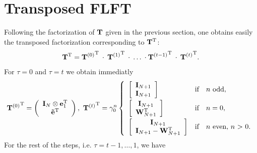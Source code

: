 \section{Transposed FLFT}
Following the factorization of $\mathbf{T}$ given in the previous section, one obtains easily the transposed factorization corresponding to $\mathbf{T^{\text{\rm{T}}}}$:
\[
  \mathbf{T}^{\text{\rm{T}}} = {\mathbf{T}^{(0)}}^{\text{\rm{T}}} \: \cdot \: {\mathbf{T}^{(1)}}^{\text{\rm{T}}} \: \cdot \: \ldots \: \cdot {\mathbf{T}^{(t-1)}}^{\text{\rm{T}}} \: \cdot \: {\mathbf{T}^{(t)}}^{\text{\rm{T}}}.
\] 
For $\tau = 0$ and $\tau = t$ we obtain immediatly
\[
  {\V{T}^{(0)}}^{\transp} = 
     \left(\begin{array}{c} 
       \V{I}_{N} \otimes \V{e}_{1}^{\transp}\\ 
       \V{\tilde{e}}^{\transp} 
     \end{array}\right),\  
   {\V{T}^{(t)}}^{\transp} = \gamma_{0}^n 
     \left\{\begin{array}{l@{\quad \text{if} \quad}l} 
       \left[ \begin{array}{c} \V{I}_{N+1} \\ \V{I}_{N+1}                         \end{array} \right] & \text{$n$ odd},          \\[2ex]
       \left[ \begin{array}{c} \V{I}_{N+1} \\               \V{W}_{N+1}^{\transp} \end{array} \right] & \text{$n = 0$},          \\[2ex]
       \left[ \begin{array}{c} \V{I}_{N+1} \\ \V{I}_{N+1} - \V{W}_{N+1}^{\transp} \end{array} \right] & \text{$n$ even, $n$ > 0}.
     \end{array}\right.
\]
For the rest of the steps, i.e. $\tau = t-1,\ldots,1$, we have
